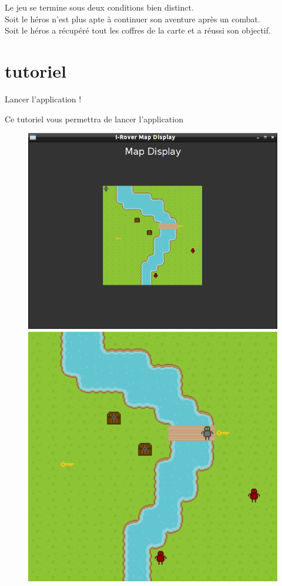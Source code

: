 \documentclass[a4paper 12pts]{article}
\begin{document}
Le jeu se termine sous deux conditions bien distinct.\\
Soit le héros n'est plus apte à continuer son aventure après un combat.\\
Soit le héros a récupéré tout les coffres de la carte et a réussi son objectif.\\

\newpage

\section{tutoriel}
\vspace{0.75cm}

Lancer l'application !

Ce tutoriel vous permettra de lancer l'application

\begin{figure}[h]
   \includegraphics[width=350pt]{Illustration/screens/screen1.png}
	\vspace{5mm}
   \includegraphics[width=350pt]{Illustration/screens/screen2.png}
\end{figure}
\end{document}
